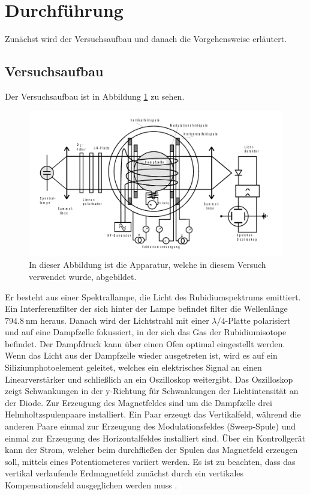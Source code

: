 \section{Durchführung}
\label{sec:Durchführung}

Zunächst wird der Versuchsaufbau und danach die Vorgehensweise erläutert.

\subsection{Versuchsaufbau}

Der Versuchsaufbau ist in Abbildung \ref{abb2} zu sehen. 
\begin{figure}
    \centering
    \includegraphics[width=\textwidth]{figure/Aufbau.pdf}
    \caption{In dieser Abbildung ist die Apparatur, welche in diesem Versuch verwendet
    wurde, abgebildet. \cite{3}}
    \label{abb2}
\end{figure}
Er besteht aus einer Spektrallampe, die Licht des Rubidiumspektrums emittiert.
Ein Interferenzfilter der sich hinter der Lampe befindet filter die Wellenlänge
$\SI{794,8}{\nano\meter}$ heraus.
Danach wird der Lichtstrahl mit einer $\lambda /4$-Platte polarisiert und auf eine 
Dampfzelle fokussiert, in der sich das Gas der Rubidiumisotope befindet. Der Dampfdruck
kann über einen Ofen optimal eingestellt werden.
Wenn das Licht aus der Dampfzelle wieder ausgetreten ist, wird es auf ein 
Siliziumphotoelement geleitet, welches ein elektrisches Signal an einen 
Linearverstärker und schließlich an ein Oszilloskop weitergibt.
Das Oszilloskop zeigt Schwankungen in der y-Richtung für Schwankungen der 
Lichtintensität an der Diode.
Zur Erzeugung des Magnetfeldes sind um die Dampfzelle drei Helmholtzspulenpaare
installiert. Ein Paar erzeugt das Vertikalfeld, während die anderen Paare einmal 
zur Erzeugung des Modulationsfeldes (Sweep-Spule) und einmal zur Erzeugung des 
Horizontalfeldes installiert sind. Über ein Kontrollgerät kann der 
Strom, welcher beim durchfließen der Spulen das Magnetfeld erzeugen soll, mittels 
eines Potentiometeres variiert werden.
Es ist zu beachten, dass das vertikal verlaufende Erdmagnetfeld zunächst durch ein 
vertikales Kompensationsfeld ausgeglichen werden muss \cite{3}.

